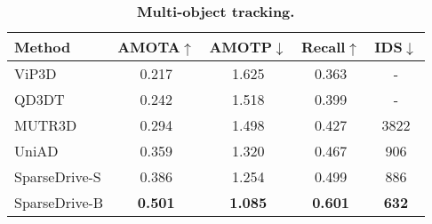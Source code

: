 \begin{table}[htbp]
\centering
\scalebox{0.8}
{
\begin{tabular}{l|cccc}
\toprule
Method & \cellcolor{gray!30}AMOTA$\uparrow$ & AMOTP$\downarrow$ & Recall$\uparrow$ & IDS$\downarrow$ \\
\midrule
ViP3D~\cite{vip3d} & \cellcolor{gray!30}0.217 & 1.625 & 0.363 & - \\
QD3DT~ & \cellcolor{gray!30}0.242 & 1.518 & 0.399 & - \\
MUTR3D~\cite{mutr3d} & \cellcolor{gray!30}0.294 & 1.498 & 0.427 & 3822 \\
UniAD & \cellcolor{gray!30}0.359 & 1.320 & 0.467 & 906 \\
SparseDrive-S & \cellcolor{gray!30}0.386 & 1.254 & 0.499 & 886 \\
SparseDrive-B & \cellcolor{gray!30}\textbf{0.501} & \textbf{1.085} & \textbf{0.601} & \textbf{632} \\
\bottomrule
\end{tabular}
}
\vspace{5pt}
\caption{\textbf{Multi-object tracking.} 
}
\label{tab:track}
\end{table} 
